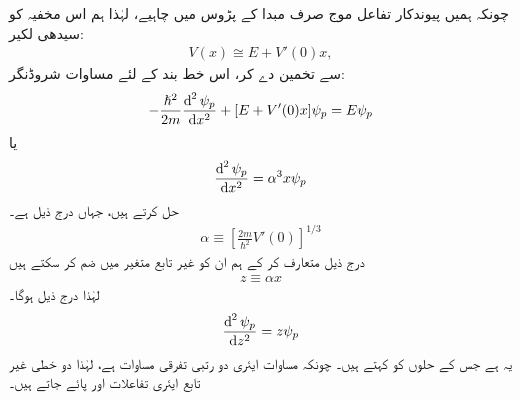 چونکہ ہمیں پیوندکار تفاعل موج  صرف مبدا کے پڑوس میں چاہیے، لہٰذا ہم اس مخفیہ کو سیدھی لکیر: 
\begin{align}\label{مساوات_وقب_خط_بند_مخفیہ}
	V(x) \cong E + V'(0)x,
\end{align}
سے تخمین دے کر، اس خط بند  کے لئے مساوات شروڈنگر:
\begin{align*}
	-\frac{\hslash^{2}}{2m} \frac{\dif^{\,2}\psi_{p}}{\dif x^{2}} +[E+V'(0)x]\psi_{p}=E\psi_{p}
\end{align*}
یا 
\begin{align}
	\frac{\dif^{\,2} \psi_{p}}{\dif x^{2}} = \alpha^{3} x\psi_{p}
\end{align}
 حل کرتے ہیں، جہاں درج ذیل ہے۔
\begin{align}\label{مساوات_وقب_خط_بند_اور_مستقل}
	\alpha\equiv\left[\frac{2m}{\hslash^{2}} V'(0)\right]^{1/3}
\end{align}
درج ذیل متعارف کر کے ہم ان  کو غیر تابع متغیر میں ضم کر سکتے ہیں
\begin{align}
	z\equiv\alpha x
\end{align}
لہٰذا درج ذیل ہوگا۔
\begin{align}
	\frac{\dif^{\,2}\psi_{p}}{\dif z^{2}}=z\psi_{p}
\end{align}
یہ  ہے جس کے حلوں کو  کہتے ہیں۔  چونکہ مساوات ایئری دو رتبی تفرقی مساوات ہے، لہٰذا دو خطی غیر تابع ایئری تفاعلات  اور  پائے جاتے ہیں۔

